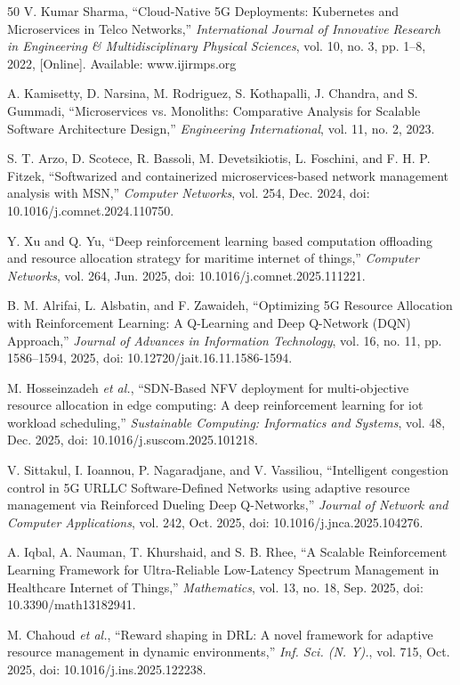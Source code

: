 \documentclass[conference]{IEEEtran}
\begin{document}
\begin{thebibliography}{50}
 V. Kumar Sharma, ``Cloud-Native 5G Deployments: Kubernetes and Microservices in Telco Networks,'' \emph{International Journal of Innovative Research in Engineering \& Multidisciplinary Physical Sciences}, vol. 10, no. 3, pp. 1--8, 2022, {[}Online{]}. Available: www.ijirmps.org

 A. Kamisetty, D. Narsina, M. Rodriguez, S. Kothapalli, J. Chandra, and S. Gummadi, ``Microservices vs. Monoliths: Comparative Analysis for Scalable Software Architecture Design,'' \emph{Engineering International}, vol. 11, no. 2, 2023.

 S. T. Arzo, D. Scotece, R. Bassoli, M. Devetsikiotis, L. Foschini, and F. H. P. Fitzek, ``Softwarized and containerized microservices-based network management analysis with MSN,'' \emph{Computer Networks}, vol. 254, Dec. 2024, doi: 10.1016/j.comnet.2024.110750.

 Y. Xu and Q. Yu, ``Deep reinforcement learning based computation offloading and resource allocation strategy for maritime internet of things,'' \emph{Computer Networks}, vol. 264, Jun. 2025, doi: 10.1016/j.comnet.2025.111221.

 B. M. Alrifai, L. Alsbatin, and F. Zawaideh, ``Optimizing 5G Resource Allocation with Reinforcement Learning: A Q-Learning and Deep Q-Network (DQN) Approach,'' \emph{Journal of Advances in Information Technology}, vol. 16, no. 11, pp. 1586--1594, 2025, doi: 10.12720/jait.16.11.1586-1594.

 M. Hosseinzadeh \emph{et al.}, ``SDN-Based NFV deployment for multi-objective resource allocation in edge computing: A deep reinforcement learning for iot workload scheduling,'' \emph{Sustainable Computing: Informatics and Systems}, vol. 48, Dec. 2025, doi: 10.1016/j.suscom.2025.101218.

 V. Sittakul, I. Ioannou, P. Nagaradjane, and V. Vassiliou, ``Intelligent congestion control in 5G URLLC Software-Defined Networks using adaptive resource management via Reinforced Dueling Deep Q-Networks,'' \emph{Journal of Network and Computer Applications}, vol. 242, Oct. 2025, doi: 10.1016/j.jnca.2025.104276.

 A. Iqbal, A. Nauman, T. Khurshaid, and S. B. Rhee, ``A Scalable Reinforcement Learning Framework for Ultra-Reliable Low-Latency Spectrum Management in Healthcare Internet of Things,'' \emph{Mathematics}, vol. 13, no. 18, Sep. 2025, doi: 10.3390/math13182941.

 M. Chahoud \emph{et al.}, ``Reward shaping in DRL: A novel framework for adaptive resource management in dynamic environments,'' \emph{Inf. Sci. (N. Y).}, vol. 715, Oct. 2025, doi: 10.1016/j.ins.2025.122238.


\end{thebibliography}
\end{document}
